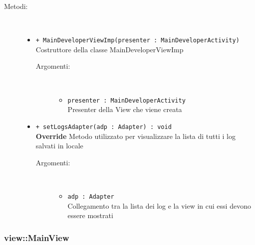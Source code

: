 \documentclass[../DefinizioneDiProdotto.tex]{subfiles}
\begin{document}
\begin{description}
\begin{itemize}
\end{itemize}
\item[Metodi:] \
\begin{itemize}
\item \texttt{+ MainDeveloperViewImp(presenter : MainDeveloperActivity)}\\
Costruttore della classe MainDeveloperViewImp
 \begin{description}
\item[Argomenti:] \
\begin{itemize}
\item \texttt{presenter : MainDeveloperActivity}\\
Presenter della View che viene creata\end{itemize}
\end{description}
\item \texttt{+ setLogsAdapter(adp : Adapter) : void}\\
\textbf{Override} Metodo utilizzato per visualizzare la lista di tutti i log salvati in locale
 \begin{description}
\item[Argomenti:] \
\begin{itemize}
\item \texttt{adp : Adapter}\\
Collegamento tra la lista dei log e la view in cui essi devono essere mostrati\end{itemize}
\end{description}
\end{itemize}
\end{description}

\subsubsection{view::MainView}
\end{document}
